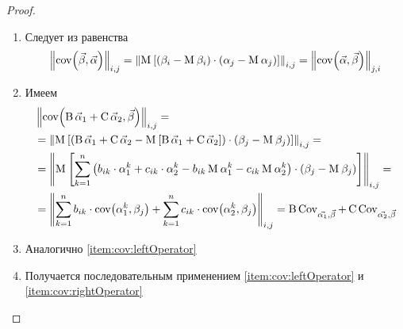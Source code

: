 \begin{proof}
  \begin{enumerate}
    \item\label{item:cov:commutativity}
      Следует из равенства
      \begin{equation*}
        \left\| \operatorname{cov}\!\left( \vec{\beta}, \vec{\alpha} \right) \right\|_{i,j}
        = \left\| \operatorname{M}_{} \left[ \left( \beta_i - \operatorname{M}_{} \beta_i \right)
          \cdot \left( \alpha_j - \operatorname{M}_{} \alpha_j \right) \right] \right\|_{i,j}
        = \left\| \operatorname{cov}\!\left( \vec{\alpha}, \vec{\beta} \right) \right\|_{j,i}
      \end{equation*}
    \item\label{item:cov:leftOperator}
      Имеем
      \begin{equation*}
        \begin{split}
          &\left\| \operatorname{cov}\!\left( \operatorname{B} \vec{\alpha}_1
              + \operatorname{C} \vec{\alpha}_2,
            \vec{\beta} \right) \right\|_{i,j} = \\
          &= \left\| \operatorname{M}_{} \left[ \left(\operatorname{B} \vec{\alpha}_1
              + \operatorname{C} \vec{\alpha}_2
              - \operatorname{M}_{} \left[ \operatorname{B} \vec{\alpha}_1
              + \operatorname{C} \vec{\alpha}_2 \right] \right)
            \cdot \left( \beta_j - \operatorname{M}_{} \beta_j \right) \right] \right\|_{i,j} = \\
          &= \left\| \operatorname{M}_{} \left[ \sum_{k=1}^{n} \left(b_{ik} \cdot \alpha_1^k
              + c_{ik} \cdot \alpha_2^k
              - b_{ik} \operatorname{M}_{} \alpha_1^k
              - c_{ik} \operatorname{M}_{} \alpha_2^k \right)
            \cdot \left( \beta_j - \operatorname{M}_{} \beta_j \right) \right] \right\|_{i,j} = \\
          &= \left\| \sum_{k=1}^{n} b_{ik} \cdot \operatorname{cov}\!\left( \alpha_1^k, \beta_j \right)
              + \sum_{k=1}^{n} c_{ik} \cdot \operatorname{cov}\!\left( \alpha_2^k, \beta_j \right)
            \right\|_{i,j}
          = \operatorname{B} \operatorname{Cov}^{}_{\vec{\alpha_1}, \vec{\beta}}
            + \operatorname{C} \operatorname{Cov}^{}_{\vec{\alpha_2}, \vec{\beta}}
        \end{split}
      \end{equation*}
    \item\label{item:cov:rightOperator}
      Аналогично \ref{item:cov:leftOperator}
    \item\label{item:cov:operators}
      Получается последовательным применением \ref{item:cov:leftOperator}
      и \ref{item:cov:rightOperator}
  \end{enumerate}
\end{proof}


